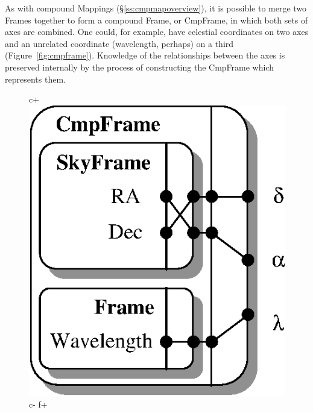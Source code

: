 \documentclass[twoside,11pt]{article}
\newenvironment{latexonly}{}{}
\newcommand{\secref}[1]{\S\ref{#1}}
\newcommand{\secref}[1]{\ref{#1}}
\begin{document}
\begin{latexonly}
   As with compound Mappings (\secref{ss:cmpmapoverview}), it is possible
   to merge two Frames together to form a compound Frame, or CmpFrame, in
   which both sets of axes are combined.  One could, for example, have
   celestial coordinates on two axes and an unrelated coordinate
   (wavelength, perhaps) on a third (Figure~\ref{fig:cmpframe}).
   Knowledge of the relationships between the axes is preserved
   internally by the process of constructing the CmpFrame which
   represents them.
   \begin{figure}
   \begin{center}
c+
   \includegraphics[scale=0.85]{sun211_figures/cmpframe.eps}
c-
f+

\end{center}
\end{figure}
\end{latexonly}
\end{document}
